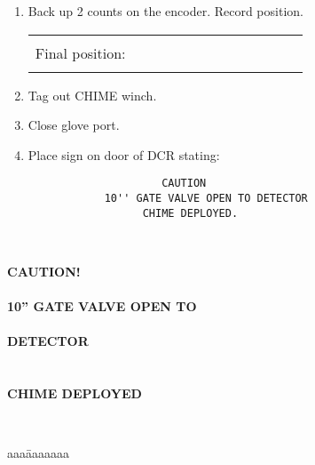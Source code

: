 \begin{enumerate}
\item\checkbox Back up 2 counts on the encoder. Record position.
     \begin{center}
     \begin{tabular}{|l|}
     \hline
      \\
     Final position:~~~~~~~~~~~~~~~~~~~~~~~~\\
      \\
     \hline
     \end{tabular}
     \end{center}
  
\item\checkbox Tag out CHIME winch.
  
\item\checkbox Close glove port.
  
\item\checkbox Place sign on door of DCR stating:
  \begin{verbatim}
                     CAUTION
            10'' GATE VALVE OPEN TO DETECTOR
                  CHIME DEPLOYED.
  \end{verbatim}
\end{enumerate}
  

\newpage
~\\
\vspace*{2in}
\begin{center}
{\bf\Huge CAUTION!}\\
~\\
{\bf\Huge 10'' GATE VALVE OPEN TO}\\
~\\
{\bf\Huge       DETECTOR}\\
~\\
~\\
{\bf\Huge   CHIME DEPLOYED}
\end{center}
~\\
\vspace*{1in}
\begin{tabbing}
aaa\=aaaaaaa\kill
    \\
\>  \\
\> \\
     \\
\end{tabbing}





